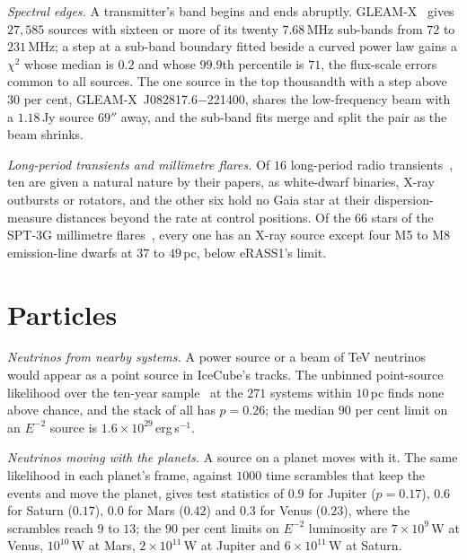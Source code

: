 \documentclass[3p,11pt]{elsarticle}
\begin{document}
\emph{Spectral edges.} A transmitter's band begins and ends abruptly. GLEAM-X~\cite{HurleyWalker2022}
gives $27{,}585$ sources with sixteen or more of its twenty $7.68$\,MHz sub-bands from
$72$ to $231$\,MHz; a step at a sub-band boundary fitted beside a curved power law gains a
$\chi^2$ whose median is $0.2$ and whose $99.9$th percentile is $71$, the flux-scale errors
common to all sources. The one source in the top thousandth with a step above $30$ per
cent, GLEAM-X~J082817.6$-$221400, shares the low-frequency beam with a $1.18$\,Jy source
$69''$ away, and the sub-band fits merge and split the pair as the beam shrinks.

\emph{Long-period transients and millimetre flares.} Of $16$ long-period radio
transients~\cite{Rea2026}, ten are given a natural nature by their papers, as white-dwarf
binaries, X-ray outbursts or rotators, and the other six hold no Gaia star at their
dispersion-measure distances beyond the rate at control positions. Of the $66$ stars of
the SPT-3G millimetre flares~\cite{Tandoi2024}, every one has an X-ray source except four
M5 to M8 emission-line dwarfs at $37$ to $49$\,pc, below eRASS1's limit.

\section{Particles}\label{sec:particles}

\emph{Neutrinos from nearby systems.} A power source or a beam of TeV neutrinos would
appear as a point source in IceCube's tracks. The unbinned point-source likelihood over
the ten-year sample~\cite{IceCube2021} at the $271$ systems within $10$\,pc finds none above
chance, and the stack of all has $p=0.26$; the median $90$ per cent limit on an $E^{-2}$
source is $1.6\times10^{29}$\,erg\,s$^{-1}$.

\emph{Neutrinos moving with the planets.} A source on a planet moves with it. The same
likelihood in each planet's frame, against $1000$ time scrambles that keep the events and
move the planet, gives test statistics of $0.9$ for Jupiter ($p=0.17$), $0.6$ for Saturn
($0.17$), $0.0$ for Mars ($0.42$) and $0.3$ for Venus ($0.23$), where the scrambles reach
$9$ to $13$; the $90$ per cent limits on $E^{-2}$ luminosity are $7\times10^{9}$\,W at
Venus, $10^{10}$\,W at Mars, $2\times10^{11}$\,W at Jupiter and $6\times10^{11}$\,W at
Saturn.
\end{document}
